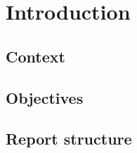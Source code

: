 \section{Introduction}



\subsection{Context}

\subsection{Objectives}

\subsection{Report structure}

